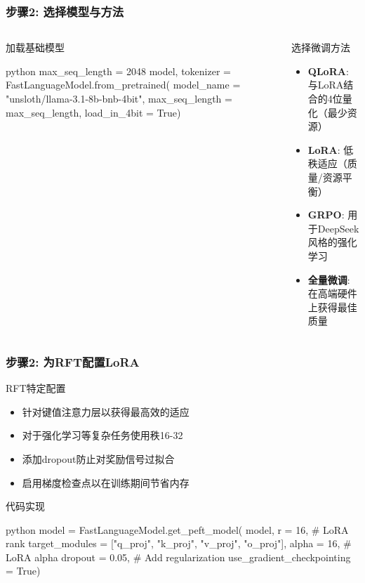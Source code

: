 \documentclass[aspectratio=169]{beamer}
\begin{document}
\begin{frame}[fragile]
	\frametitle{步骤2: 选择模型与方法}
	\begin{columns}
		\begin{column}{0.48\textwidth}
			\begin{block}{加载基础模型}
			\begin{mintedbox}{python}
max_seq_length = 2048
model, tokenizer = FastLanguageModel.from_pretrained(
    model_name = "unsloth/llama-3.1-8b-bnb-4bit",
    max_seq_length = max_seq_length,
    load_in_4bit = True)
			\end{mintedbox}
			\end{block}
		\end{column}
		\begin{column}{0.48\textwidth}
			\begin{block}{选择微调方法}
				\begin{itemize}
					\item \textbf{QLoRA}: 与LoRA结合的4位量化（最少资源）
					\item \textbf{LoRA}: 低秩适应（质量/资源平衡）
					\item \textbf{GRPO}: 用于DeepSeek风格的强化学习
					\item \textbf{全量微调}: 在高端硬件上获得最佳质量
				\end{itemize}
			\end{block}
		\end{column}
	\end{columns}
\end{frame}

\begin{frame}[fragile]
	\frametitle{步骤2: 为RFT配置LoRA}
	\begin{block}{RFT特定配置}
		\begin{itemize}
			\item 针对键值注意力层以获得最高效的适应
			\item 对于强化学习等复杂任务使用秩16-32
			\item 添加dropout防止对奖励信号过拟合
			\item 启用梯度检查点以在训练期间节省内存
		\end{itemize}
	\end{block}
	\begin{block}{代码实现}
		\begin{mintedbox}{python}
model = FastLanguageModel.get_peft_model(
    model,
    r = 16,  # LoRA rank
    target_modules = ["q_proj", "k_proj", "v_proj", "o_proj"],
    alpha = 16,  # LoRA alpha
    dropout = 0.05,  # Add regularization
    use_gradient_checkpointing = True)
		\end{mintedbox}
	\end{block}
\end{frame}
\end{document}
